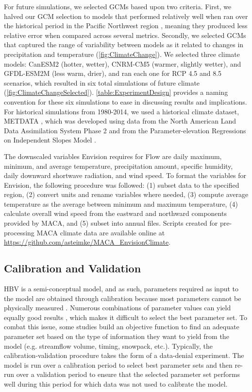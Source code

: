 \documentclass[water,article,submit,moreauthors,pdftex,10pt,a4paper]{mdpi}
\theoremstyle{mdpi}
\newcounter{ex}
\newcounter{re}
\theoremstyle{mdpidefinition}
\begin{document}
For future simulations, we selected GCMs based upon two criteria. First, we halved our GCM selection to models that performed relatively well when ran over the historical period in the Pacific Northwest region \citep{Rupp:2013ea}, meaning they produced less relative error when compared across several metrics. Secondly, we selected GCMs that captured the range of variability between models as it related to changes in precipitation and temperature (\cref{fig:ClimateChange}). We selected three climate models: CanESM2 (hotter, wetter), CNRM-CM5 (warmer, slightly wetter), and GFDL-ESM2M (less warm, drier), and ran each one for RCP 4.5 and 8.5 scenarios, which resulted in six total simulations of future climate (\cref{fig:ClimateChangeSelected}). \cref{table:ExperimentDesign} provides a naming convention for these six simulations to ease in discussing results and implications. For historical simulations from 1980-2014, we used a historical climate dataset, METDATA \citep{Abatzoglou:2011em}, which was developed using data from the North American Land Data Assimilation System Phase 2 \citep[NLDAS-2,][]{Mitchell:2004hf} and from the Parameter-elevation Regressions on Independent Slopes Model \citep[PRISM,][]{Daly:2008hsa}.  

The downscaled variables Envision requires for Flow are daily maximum, minimum, and average temperature, precipitation amount, specific humidity, daily downward shortwave radiation, and wind speed. To format the variables for Envision, the following procedure was followed: (1) subset data to the specified region, (2) convert units and rename variables where needed, (3) compute average temperature as the average between minimum and maximum temperature, (4) calculate overall wind speed from the eastward and northward components provided by MACA, and (5) subset into annual files. Scripts created for pre-processing MACA climate data are available online at \href{https://github.com/asteimke/MACA\_EnvisionClimate}{https://github.com/asteimke/MACA\_EnvisionClimate}.

\subsection{Calibration and Validation}

HBV is a semi-conceptual model, and as such, parameters required as input to the model are obtained through calibration because most parameters cannot be physically measured \citep{Bergstrom:2015ck}. Numerous combinations of parameter values can yield equally good results \citep[i.e. the equifinality issue,][]{Beven:2006wa,Gupta:2005wl}, which makes it difficult to select the best parameter set. To combat this issue, some studies \citep{Madsen:2003un,Inouye:2014ws} build an objective function to find an adequate parameter set based on the type of information they want to yield from the model (e.g. streamflow volume, timing, snowpack, etc.). Typically, the calibration-validation procedure takes the form of a data-denial experiment. The model is run over a calibration period to select best parameter sets and then re-run over a validation period to ensure that the selected parameter set performs well during this period for which data was not used to calibrate the model.
\end{document}
